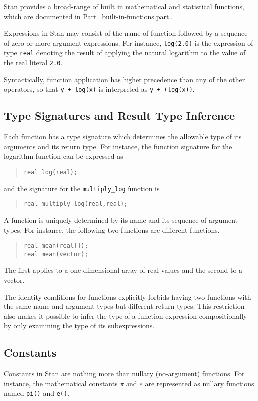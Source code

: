 \documentclass[10pt]{report}
\newcommand{\Stan}{Stan\xspace}
\newcommand{\code}[1]{{\tt #1}}
\newcommand{\refpart}[1]{Part~\ref{#1.part}}
\begin{document}
\Stan provides a broad-range of built in mathematical and statistical
functions, which are documented in \refpart{built-in-functions}.

Expressions in \Stan may consist of the name of function followed by a
sequence of zero or more argument expressions.  For instance,
\code{log(2.0)} is the expression of type \code{real} denoting the
result of applying the natural logarithm to the value of the real
literal \code{2.0}.

Syntactically, function application has higher precedence than any of
the other operators, so that \code{y + log(x)} is interpreted as
\code{y + (log(x))}.

\subsection{Type Signatures and Result Type Inference}

Each function has a type signature which determines the allowable type
of its arguments and its return type.  For instance, the function
signature for the logarithm function can be expressed as
%
\begin{quote}
\code{real log(real);}
\end{quote}
%
and the signature for the \code{multiply\_log} function is
%
\begin{quote}
\code{real multiply\_log(real,real);}
\end{quote}
%
A function is uniquely determined by its name and its sequence of
argument types.  For instance, the following two functions are
different functions.
%
\begin{quote}
\code{real mean(real[]);}
\\
\code{real mean(vector);}
\end{quote}
%
The first applies to a one-dimensional array of real values and the
second to a vector.

The identity conditions for functions explicitly forbids having two
functions with the same name and argument types but different return
types.  This restriction also makes it possible to infer the type of a
function expression compositionally by only examining the type of its
subexpressions. 

\subsection{Constants}

Constants in \Stan are nothing more than nullary (no-argument)
functions.  For instance, the mathematical constants $\pi$ and $e$ are
represented as nullary functions named \code{pi()} and \code{e()}.
\end{document}
